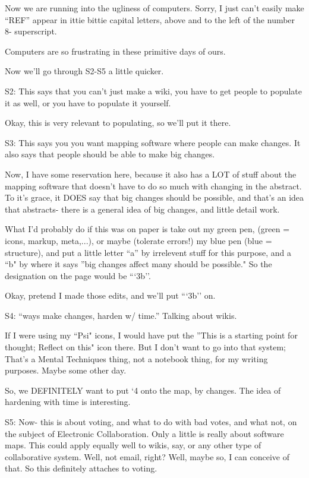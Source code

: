 \documentclass[oneside]{book}
\begin{document}
Now we are running into the ugliness of computers. Sorry, I just can't
easily make ``REF'' appear in ittie bittie capital letters, above and to
the left of the number 8- superscript.

Computers are so frustrating in these primitive days of ours.

Now we'll go through S2-S5 a little quicker.

S2: This says that you can't just make a wiki, you have to get people
to populate it as well, or you have to populate it yourself.

Okay, this is very relevant to populating, so we'll put it there.

S3: This says you you want mapping software where people can make
changes. It also says that people should be able to make big changes.

Now, I have some reservation here, because it also has a LOT of stuff
about the mapping software that doesn't have to do so much with
changing in the abstract. To it's grace, it DOES say that big changes
should be possible, and that's an idea that abstracts- there is a
general idea of big changes, and little detail work.

What I'd probably do if this was on paper is take out my green pen,
(green = icons, markup, meta,...), or maybe (tolerate errors!) my blue
pen (blue = structure), and put a little letter ``a'' by irrelevent
stuff for this purpose, and a ``b" by where it says ''big changes affect
many should be possible." So the designation on the page would be
```3b''.

Okay, pretend I made those edits, and we'll put ```3b'' on.

S4: ``ways make changes, harden w/ time.'' Talking about wikis.

If I were using my ``Psi" icons, I would have put the ''This is a
starting point for thought; Reflect on this" icon there. But I don't
want to go into that system; That's a Mental Techniques thing, not a
notebook thing, for my writing purposes. Maybe some other day.

So, we DEFINITELY want to put `4 onto the map, by changes. The idea of
hardening with time is interesting.

S5: Now- this is about voting, and what to do with bad votes, and what
not, on the subject of Electronic Collaboration. Only a little is
really about software maps. This could apply equally well to wikis,
say, or any other type of collaborative system. Well, not email,
right? Well, maybe so, I can conceive of that. So this definitely
attaches to voting.
\end{document}
